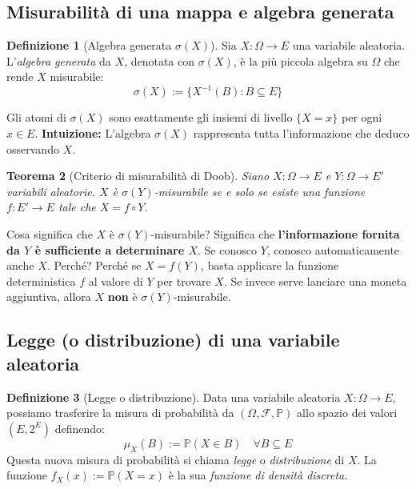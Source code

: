 \documentclass[11pt, a4paper]{report}
\theoremstyle{plain}
\newtheorem{theorem}{Teorema}[chapter]
\theoremstyle{definition}
\newtheorem{definition}[theorem]{Definizione}
\theoremstyle{remark}
\newcommand{\PP}{\mathbb{P}}
\newcommand{\F}{\mathcal{F}}
\newcommand{\1}{\mathbf{1}}
\begin{document}
\subsection{Misurabilità di una mappa e algebra generata}

\begin{definition}[Algebra generata $\sigma(X)$]
Sia $X : \Omega \to E$ una variabile aleatoria. L'\emph{algebra generata} da $X$, denotata con $\sigma(X)$, è la più piccola algebra su $\Omega$ che rende $X$ misurabile:
\[ \sigma(X) := \{ X^{-1}(B) : B \subseteq E \} \]
\end{definition}

Gli atomi di $\sigma(X)$ sono esattamente gli insiemi di livello $\{X = x\}$ per ogni $x \in E$. 
\textbf{Intuizione:} L'algebra $\sigma(X)$ rappresenta tutta l'informazione che deduco osservando $X$.

\begin{theorem}[Criterio di misurabilità di Doob]
Siano $X : \Omega \to E$ e $Y : \Omega \to E'$ variabili aleatorie. 
$X$ è $\sigma(Y)$-misurabile se e solo se esiste una funzione $f : E' \to E$ tale che $X = f \circ Y$.
\end{theorem}

\begin{hint}
    Cosa significa che $X$ è $\sigma(Y)$-misurabile? 
    Significa che \textbf{l'informazione fornita da $Y$ è sufficiente a determinare $X$}. Se conosco $Y$, conosco automaticamente anche $X$. 
    Perché? Perché se $X = f(Y)$, basta applicare la funzione deterministica $f$ al valore di $Y$ per trovare $X$. Se invece serve lanciare una moneta aggiuntiva, allora $X$ \textbf{non} è $\sigma(Y)$-misurabile.
\end{hint}

\subsection{Legge (o distribuzione) di una variabile aleatoria}

\begin{definition}[Legge o distribuzione]
Data una variabile aleatoria $X : \Omega \to E$, possiamo trasferire la misura di probabilità da $(\Omega, \F, \PP)$ allo spazio dei valori $(E, 2^E)$ definendo:
\[ \mu_X(B) := \PP(X \in B) \quad \forall B \subseteq E \]
Questa nuova misura di probabilità si chiama \emph{legge} o \emph{distribuzione} di $X$.
La funzione $f_X(x) := \PP(X = x)$ è la sua \emph{funzione di densità discreta}.
\end{definition}
\end{document}
